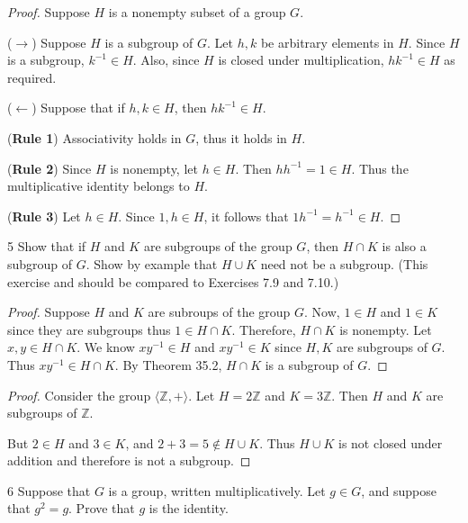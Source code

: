 \begin{proof}
    Suppose $H$ is a nonempty subset of a group $G$.

    ($\longrightarrow$) 
    Suppose $H$ is a subgroup of $G$.
    Let $h, k$ be arbitrary elements in $H$.
    Since $H$ is a subgroup, $k^{-1} \in H$.
    Also, since $H$ is closed under multiplication, $hk^{-1} \in H$ as required.

    ($\longleftarrow$)
    Suppose that if $h, k \in H$, then $hk^{-1} \in H$.

    (\textbf{Rule 1})
    Associativity holds in $G$, thus it holds in $H$.

    (\textbf{Rule 2})
    Since $H$ is nonempty, let $h \in H$.
    Then $hh^{-1} = 1 \in H$.
    Thus the multiplicative identity belongs to $H$.

    (\textbf{Rule 3})
    Let $h \in H$.
    Since $1, h \in H$, it follows that $1h^{-1} = h^{-1} \in H$.
\end{proof}

\begin{problem}{5}
    Show that if $H$ and $K$ are subgroups of the group $G$,
    then $H \cap K$ is also a subgroup of $G$. Show by example
    that $H \cup K$ need not be a subgroup. (This exercise 
    and should be compared to Exercises 7.9 and 7.10.)
\end{problem}
\solved

\begin{proof}
    Suppose $H$ and $K$ are subroups of the group $G$.
    Now, $1 \in H$ and $1 \in K$ since they are subgroups 
        thus $1 \in H \cap K$.
    Therefore, $H \cap K$ is nonempty.
    Let $x, y \in H \cap K$.
    We know $x y^{-1} \in H$ and $x y^{-1} \in K$
        since $H, K$ are subgroups of $G$.
    Thus $x y^{-1} \in H \cap K$.
    By Theorem 35.2, $H \cap K$ is a subgroup of $G$.
\end{proof}

\begin{proof}
    Consider the group $\langle\mathbb{Z}, +\rangle$.
    Let $H = 2\mathbb{Z}$ and $K = 3\mathbb{Z}$.
    Then $H$ and $K$ are subgroups of $\mathbb{Z}$.

    But $2 \in H$ and $3 \in K$, and $2 + 3 = 5 \notin H \cup K$.
    Thus $H \cup K$ is not closed under addition and therefore is not a subgroup.
\end{proof}

\begin{problem}{6}
    Suppose that $G$ is a group, written multiplicatively.
    Let $g \in G$, and suppose that $g^2 = g$.
    Prove that $g$ is the identity.
\end{problem}
\solved

